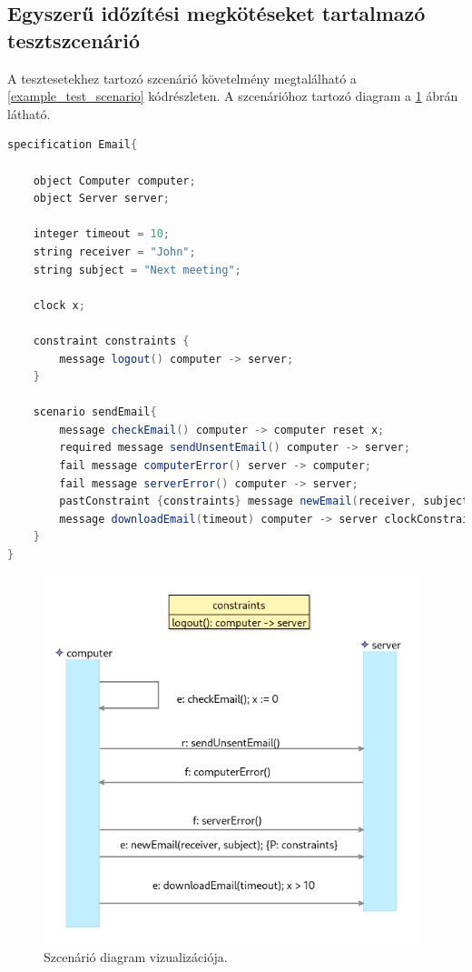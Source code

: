 \subsection{Egyszerű időzítési megkötéseket tartalmazó tesztszcenárió}

A tesztesetekhez tartozó szcenárió követelmény megtalálható a \ref{example_test_scenario} kódrészleten.
A szcenárióhoz tartozó diagram a \ref{example_test_scenario_diagram} ábrán látható.

\begin{lstlisting}[language=java, frame=single, float=ht!, caption={Tesztesethez tartozó szcenárió szöveges leírása.},captionpos=b,label=example_test_scenario]
specification Email{

    object Computer computer;
    object Server server;

    integer timeout = 10;
    string receiver = "John";
    string subject = "Next meeting";

    clock x;

    constraint constraints {
        message logout() computer -> server;
    }

    scenario sendEmail{
        message checkEmail() computer -> computer reset x;
        required message sendUnsentEmail() computer -> server;
        fail message computerError() server -> computer;
        fail message serverError() computer -> server;
        pastConstraint {constraints} message newEmail(receiver, subject) computer -> server;
        message downloadEmail(timeout) computer -> server clockConstraint {>(x,10)};
    }
}
\end{lstlisting}

\begin{figure}[!ht]
    \centering
    \includegraphics[width=110mm, keepaspectratio]{figures/diagramExample.png}
    \caption{Szcenárió diagram vizualizációja.}
    \label{example_test_scenario_diagram}
\end{figure}

